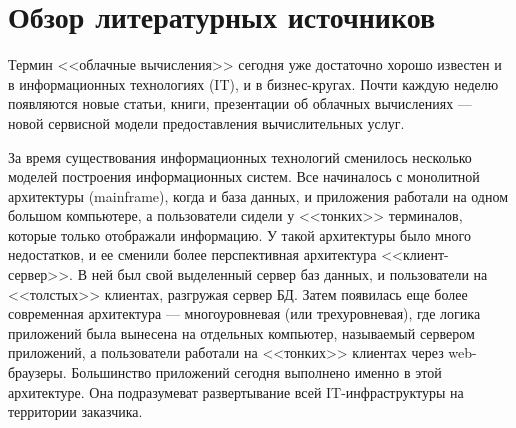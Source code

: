 \section{Обзор литературных источников}

\iffalse
Что я рассказал во введении:
\begin{itemize}
  \item что такое облачные услуги
  \item что такое iaas
  \item для чего нужна виртуализация
\end{itemize}

Примерно на 15-20 страниц.
\begin{itemize}
  \item облака + 
  \item ДЦ, типы для чего нужны tier iii + 
  \item виртуализация
  \item виды виртуализации
  \item контейнерная виртуализация
  \item представители openvz, virtuozzo, docker, lxc, Linux-VServer, solaris zones, jails, 
  \item использование
  \item перспективы в виртуализации
\end{itemize}
\fi

Термин <<облачные вычисления>> сегодня уже достаточно хорошо известен и в информационных технологиях (IT), и в бизнес-кругах.
Почти каждую неделю появляются новые статьи, книги, презентации об облачных вычислениях --- новой сервисной модели предоставления вычислительных услуг.

За время существования информационных технологий сменилось несколько моделей построения информационных систем.
Все начиналось с монолитной архитектуры (mainframe), когда и база данных, и приложения работали на одном большом компьютере, а пользователи сидели у <<тонких>> терминалов, которые только отображали информацию.
У такой архитектуры было много недостатков, и ее сменили более перспективная архитектура <<клиент-сервер>>.
В ней был свой выделенный сервер баз данных, и пользователи на <<толстых>> клиентах, разгружая сервер БД.
Затем появилась еще более современная архитектура --- многоуровневая (или трехуровневая), где логика приложений была вынесена на отдельных компьютер, называемый сервером приложений, а пользователи работали на <<тонких>> клиентах через web-браузеры.
Большинство приложений сегодня выполнено именно в этой архитектуре.
Она подразумеват развертывание всей IT-инфраструктуры на территории заказчика. \cite{oracle-db}

